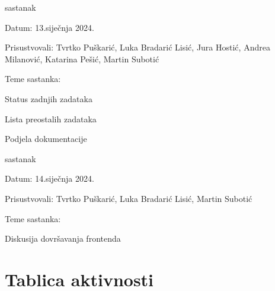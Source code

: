 \begin{packed_enum}
			\item  sastanak
			\item[] \begin{packed_item}
				\item Datum: 13.siječnja 2024.
				\item Prisustvovali: Tvrtko Puškarić, Luka Bradarić Lisić, Jura Hostić, Andrea Milanović, Katarina Pešić, Martin Subotić
				\item Teme sastanka:
				\begin{packed_item}
					\item Status zadnjih zadataka
					\item Lista preostalih zadataka
					\item Podjela dokumentacije
				\end{packed_item}
			\end{packed_item}
			
			\item  sastanak
			\item[] \begin{packed_item}
				\item Datum: 14.siječnja 2024.
				\item Prisustvovali: Tvrtko Puškarić, Luka Bradarić Lisić, Martin Subotić
				\item Teme sastanka:
				\begin{packed_item}
					\item Diskusija dovršavanja frontenda
				\end{packed_item}
			\end{packed_item}
			
			
		\end{packed_enum}
		
		\eject
		\section*{Tablica aktivnosti}

